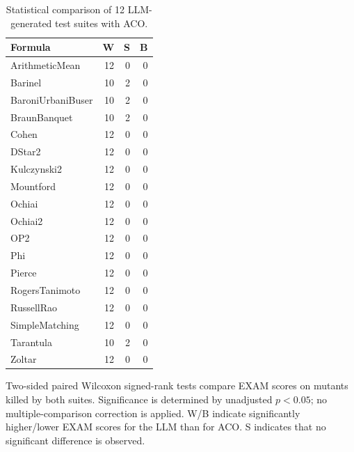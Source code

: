\begin{table}[t]
\centering
\caption{Statistical comparison of 12 LLM-generated test suites with ACO.}
\label{tab:rq3bw-pairwise-counts}
\begin{tabular}{lrrr}
\toprule
Formula & W & S & B \\
\midrule
ArithmeticMean & 12 & 0 & 0 \\
Barinel & 10 & 2 & 0 \\
BaroniUrbaniBuser & 10 & 2 & 0 \\
BraunBanquet & 10 & 2 & 0 \\
Cohen & 12 & 0 & 0 \\
DStar2 & 12 & 0 & 0 \\
Kulczynski2 & 12 & 0 & 0 \\
Mountford & 12 & 0 & 0 \\
Ochiai & 12 & 0 & 0 \\
Ochiai2 & 12 & 0 & 0 \\
OP2 & 12 & 0 & 0 \\
Phi & 12 & 0 & 0 \\
Pierce & 12 & 0 & 0 \\
RogersTanimoto & 12 & 0 & 0 \\
RussellRao & 12 & 0 & 0 \\
SimpleMatching & 12 & 0 & 0 \\
Tarantula & 10 & 2 & 0 \\
Zoltar & 12 & 0 & 0 \\
\bottomrule
\end{tabular}
\par\smallskip
\begin{minipage}{\linewidth}\footnotesize Two-sided paired Wilcoxon signed-rank tests compare EXAM scores on mutants killed by both suites. Significance is determined by unadjusted $p<0.05$; no multiple-comparison correction is applied. W/B indicate significantly higher/lower EXAM scores for the LLM than for ACO. S indicates that no significant difference is observed.
\end{minipage}
\end{table}
